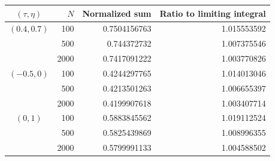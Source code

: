 \begin{tabular}{@{}crrr@{}}
\toprule
$(\tau,\eta)$ & $N$ & Normalized sum & Ratio to limiting integral \\
\midrule
$(0.4,0.7)$ & 100 & 0.7504156763 & 1.015553592 \\
 & 500 & 0.744372732 & 1.007375546 \\
 & 2000 & 0.7417091222 & 1.003770826 \\
\addlinespace
$(-0.5,0)$ & 100 & 0.4244297765 & 1.014013046 \\
 & 500 & 0.4213501263 & 1.006655397 \\
 & 2000 & 0.4199907618 & 1.003407714 \\
\addlinespace
$(0,1)$ & 100 & 0.5883845562 & 1.019112524 \\
 & 500 & 0.5825439869 & 1.008996355 \\
 & 2000 & 0.5799991133 & 1.004588502 \\
\bottomrule
\end{tabular}
